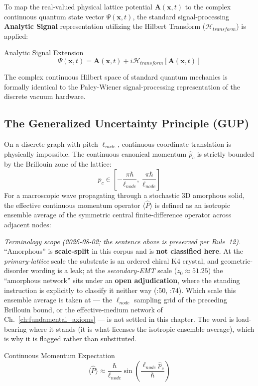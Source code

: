 To map the real-valued physical lattice potential $\mathbf{A}(\mathbf{x},t)$ to the complex continuous quantum state vector $\Psi(\mathbf{x},t)$, the standard signal-processing \textbf{Analytic Signal} representation utilizing the Hilbert Transform ($\mathcal{H}_{transform}$) is applied:
\begin{resultbox}{Analytic Signal Extension}
\begin{equation}
    \Psi(\mathbf{x},t) = \mathbf{A}(\mathbf{x},t) + i \mathcal{H}_{transform}[\mathbf{A}(\mathbf{x},t)]
\end{equation}
\end{resultbox}
The complex continuous Hilbert space of standard quantum mechanics is formally identical to the Paley-Wiener signal-processing representation of the discrete vacuum hardware.

\subsection{The Generalized Uncertainty Principle (GUP)}
On a discrete graph with pitch $\ell_{node}$, continuous coordinate translation is physically impossible. The continuous canonical momentum $\hat{p}_c$ is strictly bounded by the Brillouin zone of the lattice:
\begin{equation}
    p_c \in \left[-\frac{\pi\hbar}{\ell_{node}},\; \frac{\pi\hbar}{\ell_{node}}\right]
\end{equation}
For a macroscopic wave propagating through a stochastic 3D amorphous solid, the effective continuous momentum operator $\langle \hat{P} \rangle$ is defined as an isotropic ensemble average of the symmetric central finite-difference operator across adjacent nodes:

\noindent\emph{Terminology scope (2026-08-02; the sentence above is preserved per Rule~12).} ``Amorphous'' is \textbf{scale-split} in this corpus and is \textbf{not classified here}. At the \emph{primary-lattice} scale the substrate is an ordered chiral K4 crystal, and geometric-disorder wording is a leak; at the \emph{secondary-EMT} scale ($z_0 \approx 51.25$) the ``amorphous network'' sits under an \textbf{open adjudication}, where the standing instruction is explicitly to classify it neither way (:50, :74). Which scale this ensemble average is taken at --- the $\ell_{node}$ sampling grid of the preceding Brillouin bound, or the effective-medium network of Ch.~\ref{ch:fundamental_axioms} --- is not settled in this chapter. The word is load-bearing where it stands (it is what licenses the isotropic ensemble average), which is why it is flagged rather than substituted.
\begin{resultbox}{Continuous Momentum Expectation}
\begin{equation}
    \langle \hat{P} \rangle \approx \frac{\hbar}{\ell_{node}} \sin\left(\frac{\ell_{node} \hat{p}_c}{\hbar}\right)
\end{equation}
\end{resultbox}

